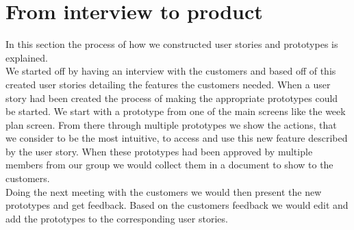 \section{From interview to product}
In this section the process of how we constructed user stories and prototypes is explained.
\\
We started off by having an interview with the customers and based off of this created user stories detailing the features the customers needed.
When a user story had been created the process of making the appropriate prototypes could be started.
We start with a prototype from one of the main screens like the week plan screen.
From there through multiple prototypes we show the actions, that we consider to be the most intuitive, to access and use this new feature described by the user story.
When these prototypes had been approved by multiple members from our group we would collect them in a document to show to the customers.
\\
Doing the next meeting with the customers we would then present the new prototypes and get feedback.
Based on the customers feedback we would edit and add the prototypes to the corresponding user stories.
